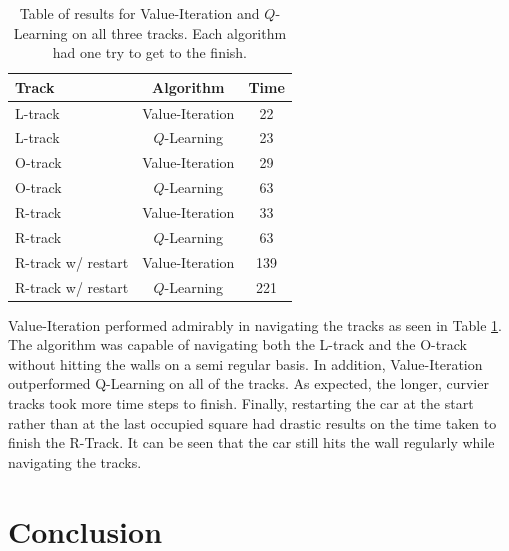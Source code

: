 \documentclass{article}
\begin{document}
				\begin{table}
					\centering
					\begin{tabular}{|l|c|c|}
						\hline
						Track & Algorithm & Time \\ \hline
						L-track & Value-Iteration & 22 \\ 
						L-track & $Q$-Learning & 23 \\ 
						O-track & Value-Iteration & 29 \\
						O-track & $Q$-Learning & 63 \\
						R-track & Value-Iteration & 33 \\
						R-track & $Q$-Learning & 63 \\
						R-track w/ restart & Value-Iteration & 139\\
						R-track w/ restart & $Q$-Learning & 221  \\ \hline
						
					\end{tabular}
					\caption{Table of results for Value-Iteration and $Q$-Learning on all three tracks. Each algorithm had one try to get to the finish.}
					\label{results}
				\end{table}
				
				Value-Iteration performed admirably in navigating the tracks as seen in Table \ref{results}. The algorithm was capable of navigating both the L-track and the O-track without hitting the walls on a semi regular basis. In addition, Value-Iteration outperformed Q-Learning on all of the tracks. As expected, the longer, curvier tracks took more time steps to finish. Finally, restarting the car at the start rather than at the last occupied square had drastic results on the time taken to finish the R-Track. It can be seen that the car still hits the wall regularly while navigating the tracks.


	\section{Conclusion}


		
	
\end{document}
